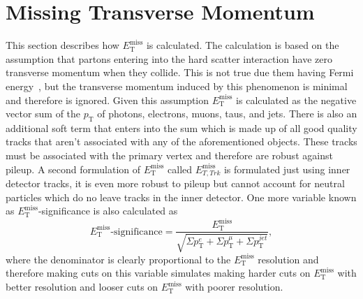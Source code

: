 \section{Missing Transverse Momentum}
\label{sec:met}
This section describes how $E_{\mathrm{T}}^{\text{miss}}$ is calculated. The calculation is based
on the assumption that partons entering into the hard scatter interaction have
zero transverse momentum when they collide. This is not true due them having
Fermi energy~\cite{fermi-energy}, but the transverse momentum induced by this
phenomenon is minimal and therefore is ignored. Given this assumption
$E_{\mathrm{T}}^{\text{miss}}$ is calculated as the negative vector sum of the $p_{\mathrm{T}}$ of
photons, electrons, muons, taus, and jets. There is also an additional soft term
that enters into the sum which is made up of all good quality tracks that aren't
associated with any of the aforementioned objects. These tracks must be
associated with the primary vertex and therefore are robust against pileup. A
second formulation of $E_{\mathrm{T}}^{\text{miss}}$ called $E_{T, Trk}^{\text{miss}}$ is
formulated just using inner detector tracks, it is even more robust to pileup
but cannot account for neutral particles which do no leave tracks in the inner
detector. One more variable known as $E_{\mathrm{T}}^{\text{miss}}$-significance is also
calculated as
\begin{equation}
  E_{\mathrm{T}}^{\text{miss}}\text{-significance} =
  \frac{E_{\mathrm{T}}^{\text{miss}}}{\sqrt{\Sigma p_{\mathrm{T}}^e + \Sigma p_{\mathrm{T}}^\mu + \Sigma p_{\mathrm{T}}^{jet}}},
  \label{eq:metsig}
\end{equation}
where the denominator is clearly proportional to the $E_{\mathrm{T}}^{\text{miss}}$
resolution and therefore making cuts on this variable simulates making harder
cuts on $E_{\mathrm{T}}^{\text{miss}}$ with better resolution and looser cuts on
$E_{\mathrm{T}}^{\text{miss}}$ with poorer resolution.

